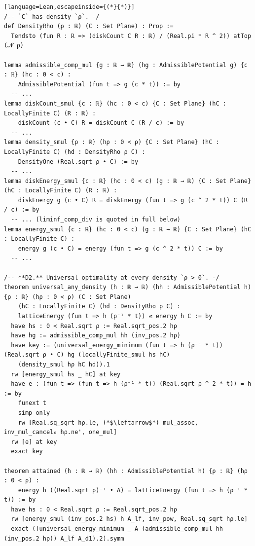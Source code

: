 \begin{leanbox}
\begin{lstlisting}[language=Lean,escapeinside={(*}{*)}]
/-- `C` has density `ρ`. -/
def DensityRho (ρ : ℝ) (C : Set Plane) : Prop :=
  Tendsto (fun R : ℝ => (diskCount C R : ℝ) / (Real.pi * R ^ 2)) atTop (𝓝 ρ)

lemma admissible_comp_mul {g : ℝ → ℝ} (hg : AdmissiblePotential g) {c : ℝ} (hc : 0 < c) :
    AdmissiblePotential (fun t => g (c * t)) := by
  -- ...
lemma diskCount_smul {c : ℝ} (hc : 0 < c) {C : Set Plane} (hC : LocallyFinite C) (R : ℝ) :
    diskCount (c • C) R = diskCount C (R / c) := by
  -- ...
lemma density_smul {ρ : ℝ} (hρ : 0 < ρ) {C : Set Plane} (hC : LocallyFinite C) (hd : DensityRho ρ C) :
    DensityOne (Real.sqrt ρ • C) := by
  -- ...
lemma diskEnergy_smul {c : ℝ} (hc : 0 < c) (g : ℝ → ℝ) {C : Set Plane} (hC : LocallyFinite C) (R : ℝ) :
    diskEnergy g (c • C) R = diskEnergy (fun t => g (c ^ 2 * t)) C (R / c) := by
  -- ... (liminf_comp_div is quoted in full below)
lemma energy_smul {c : ℝ} (hc : 0 < c) (g : ℝ → ℝ) {C : Set Plane} (hC : LocallyFinite C) :
    energy g (c • C) = energy (fun t => g (c ^ 2 * t)) C := by
  -- ...

/-- **D2.** Universal optimality at every density `ρ > 0`. -/
theorem universal_any_density (h : ℝ → ℝ) (hh : AdmissiblePotential h) {ρ : ℝ} (hρ : 0 < ρ) (C : Set Plane)
    (hC : LocallyFinite C) (hd : DensityRho ρ C) :
    latticeEnergy (fun t => h (ρ⁻¹ * t)) ≤ energy h C := by
  have hs : 0 < Real.sqrt ρ := Real.sqrt_pos.2 hρ
  have hg := admissible_comp_mul hh (inv_pos.2 hρ)
  have key := (universal_energy_minimum (fun t => h (ρ⁻¹ * t)) (Real.sqrt ρ • C) hg (locallyFinite_smul hs hC)
    (density_smul hρ hC hd)).1
  rw [energy_smul hs _ hC] at key
  have e : (fun t => (fun t => h (ρ⁻¹ * t)) (Real.sqrt ρ ^ 2 * t)) = h := by
    funext t
    simp only
    rw [Real.sq_sqrt hρ.le, (*$\leftarrow$*) mul_assoc, inv_mul_cancel₀ hρ.ne', one_mul]
  rw [e] at key
  exact key

theorem attained (h : ℝ → ℝ) (hh : AdmissiblePotential h) {ρ : ℝ} (hρ : 0 < ρ) :
    energy h ((Real.sqrt ρ)⁻¹ • A) = latticeEnergy (fun t => h (ρ⁻¹ * t)) := by
  have hs : 0 < Real.sqrt ρ := Real.sqrt_pos.2 hρ
  rw [energy_smul (inv_pos.2 hs) h A_lf, inv_pow, Real.sq_sqrt hρ.le]
  exact ((universal_energy_minimum _ A (admissible_comp_mul hh (inv_pos.2 hρ)) A_lf A_d1).2).symm


\end{lstlisting}
\end{leanbox}
